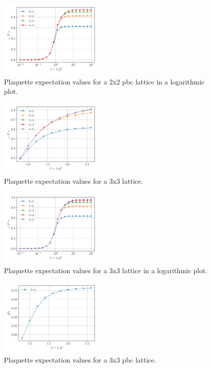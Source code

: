 \begin{figure}[h]
	\begin{center}
		\includegraphics[width=0.45\textwidth]{images/PlaquetteExp2x2PBCLog.pdf}
	\end{center}
	\caption{Plaquette expectation values for a 2x2 pbc lattice in a logarithmic plot.}
\end{figure}
\begin{figure}[h]
	\begin{center}
		\includegraphics[width=0.45\textwidth]{images/PlaquetteExp3x3.pdf}
	\end{center}
	\caption{Plaquette expectation values for a 3x3 lattice.}
\end{figure}
\begin{figure}[h]
	\begin{center}
		\includegraphics[width=0.45\textwidth]{images/PlaquetteExp3x3Log.pdf}
	\end{center}
	\caption{Plaquette expectation values for a 3x3 lattice in a logarithmic plot.}
\end{figure}
\begin{figure}[h]
	\begin{center}
		\includegraphics[width=0.45\textwidth]{images/PlaquetteExp3x3PBC.pdf}
	\end{center}
	\caption{Plaquette expectation values for a 3x3 pbc lattice.}
\end{figure}
